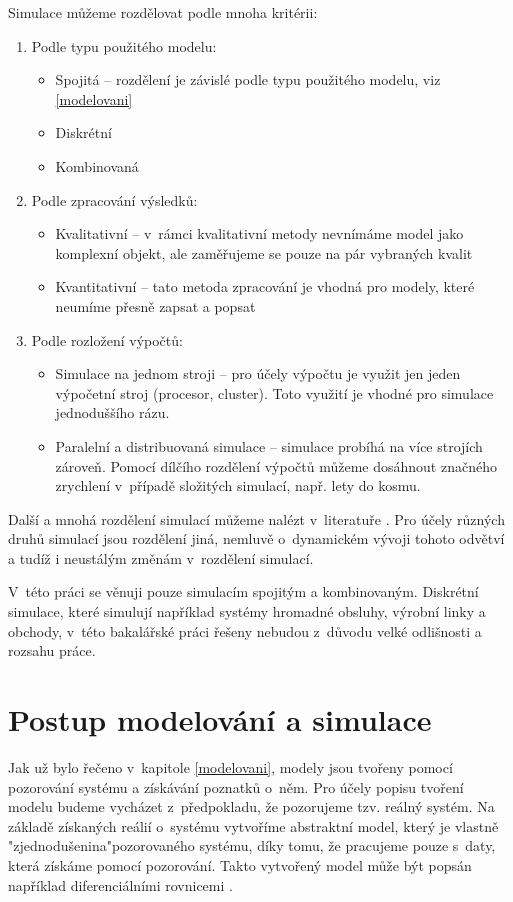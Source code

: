 Simulace můžeme rozdělovat podle mnoha kritérii:
\begin{enumerate}
    \item Podle typu použitého modelu:
        \begin{itemize}
            \item Spojitá -- rozdělení je závislé podle typu použitého modelu, viz \ref{modelovani}
            \item Diskrétní
            \item Kombinovaná
        \end{itemize}
    \item Podle zpracování výsledků:
        \begin{itemize}
            \item Kvalitativní -- v~rámci kvalitativní metody nevnímáme model jako komplexní objekt, ale zaměřujeme se pouze na pár vybraných kvalit
            \item Kvantitativní -- tato metoda zpracování je vhodná pro modely, které neumíme přesně zapsat a popsat
        \end{itemize}
    \item Podle rozložení výpočtů:
        \begin{itemize}
            \item Simulace na jednom stroji -- pro účely výpočtu je využit jen jeden výpočetní stroj (procesor, cluster). Toto využití je vhodné pro simulace jednoduššího rázu.
            \item Paralelní a distribuovaná simulace -- simulace probíhá na více strojích zároveň. Pomocí dílčího rozdělení výpočtů můžeme dosáhnout značného zrychlení v~případě složitých simulací, např. lety do kosmu.
        \end{itemize}
\end{enumerate}
Další a mnohá rozdělení simulací můžeme nalézt v~literatuře \cite{IMS-skripta}. Pro účely různých druhů simulací jsou rozdělení jiná, nemluvě o~dynamickém vývoji tohoto odvětví a tudíž i neustálým změnám v~rozdělení simulací.

V~této práci se věnuji pouze simulacím spojitým a kombinovaným. Diskrétní simulace, které simulují například systémy hromadné obsluhy, výrobní linky a obchody, v~této bakalářské práci řešeny nebudou z~důvodu velké odlišnosti a rozsahu práce.

\section{Postup modelování a simulace}
Jak už bylo řečeno v~kapitole \ref{modelovani}, modely jsou tvořeny pomocí pozorování systému a získávání poznatků o~něm. Pro účely popisu tvoření modelu budeme vycházet z~předpokladu, že pozorujeme tzv. reálný systém. Na základě získaných reálií o~systému vytvoříme abstraktní model, který je vlastně "zjednodušenina"\space pozorovaného systému, díky tomu, že pracujeme pouze s~daty, která získáme pomocí pozorování. Takto vytvořený model může být popsán například diferenciálními rovnicemi \cite{Cellierc2006}.

